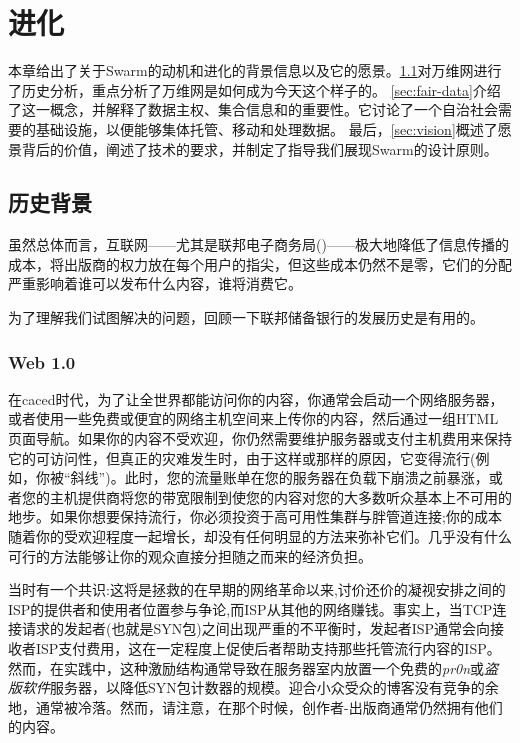 \chapter{进化\statusgreen}\label{chap:vision}



本章给出了关于Swarm的动机和进化的背景信息以及它的愿景。\ref{sec:historical_context}对万维网进行了历史分析，重点分析了万维网是如何成为今天这个样子的。
\ref{sec:fair-data}介绍了这一概念，并解释了数据主权、集合信息和的重要性。它讨论了一个自治社会需要的基础设施，以便能够集体托管、移动和处理数据。
最后，\ref{sec:vision}概述了愿景背后的价值，阐述了技术的要求，并制定了指导我们展现Swarm的设计原则。

\section{历史背景\statusgreen}\label{sec:historical_context}
\green{}
虽然总体而言，互联网——尤其是联邦电子商务局()——极大地降低了信息传播的成本，将出版商的权力放在每个用户的指尖，但这些成本仍然不是零，它们的分配严重影响着谁可以发布什么内容，谁将消费它。

为了理解我们试图解决的问题，回顾一下联邦储备银行的发展历史是有用的。

\subsection{Web 1.0 \statusgreen}\label{sec:web_1}

在caced时代，为了让全世界都能访问你的内容，你通常会启动一个网络服务器，或者使用一些免费或便宜的网络主机空间来上传你的内容，然后通过一组HTML页面导航。如果你的内容不受欢迎，你仍然需要维护服务器或支付主机费用来保持它的可访问性，但真正的灾难发生时，由于这样或那样的原因，它变得流行(例如，你被“斜线”)。此时，您的流量账单在您的服务器在负载下崩溃之前暴涨，或者您的主机提供商将您的带宽限制到使您的内容对您的大多数听众基本上不可用的地步。如果你想要保持流行，你必须投资于高可用性集群与胖管道连接;你的成本随着你的受欢迎程度一起增长，却没有任何明显的方法来弥补它们。几乎没有什么可行的方法能够让你的观众直接分担随之而来的经济负担。

当时有一个共识:这将是拯救的在早期的网络革命以来,讨价还价的凝视安排之间的ISP的提供者和使用者位置参与争论,而ISP从其他的网络赚钱。事实上，当TCP连接请求的发起者(也就是SYN包)之间出现严重的不平衡时，发起者ISP通常会向接收者ISP支付费用，这在一定程度上促使后者帮助支持那些托管流行内容的ISP。然而，在实践中，这种激励结构通常导致在服务器室内放置一个免费的\emph{pr0n}或\emph{盗版软件}服务器，以降低SYN包计数器的规模。迎合小众受众的博客没有竞争的余地，通常被冷落。然而，请注意，在那个时候，创作者-出版商通常仍然拥有他们的内容。

